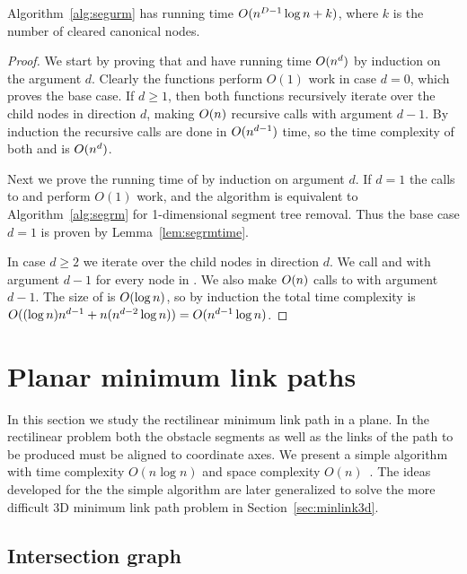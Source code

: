 \documentclass[english,gradu]{tktltiki2018}
\begin{document}
\begin{lem}\label{lem:segurmtime}Algorithm~\ref{alg:segurm} has running time $O(n^{D-1}\log n + k)$, where $k$ is the number of cleared canonical nodes.\end{lem}
\begin{proof}
We start by proving that \pdst and \recomp have running time $O(n^d)$ by induction on the argument $d$.
Clearly the functions perform $O(1)$ work in case $d=0$, which proves the base case.
If $d\ge 1$, then both functions recursively iterate over the child nodes in direction $d$, making $O(n)$ recursive calls with argument $d-1$.
By induction the recursive calls are done in $O(n^{d-1})$ time, so the time complexity of both \pdst and \recomp is $O(n^d)$.

Next we prove the running time of \cleardt by induction on argument $d$.
If $d=1$ the calls to \pdst and \recomp perform $O(1)$ work, and the algorithm is equivalent to Algorithm~\ref{alg:segrm} for 1-dimensional segment tree removal.
Thus the base case $d=1$ is proven by Lemma~\ref{lem:segrmtime}.

In case $d\ge 2$ we iterate over the child nodes in direction $d$.
We call \pdst and \recomp with argument $d-1$ for every node in .
We also make $O(n)$ calls to \cleardt with argument $d-1$.
The size of  is $O(\log n)$, so by induction the total time complexity is $O((\log n)n^{d-1} + n(n^{d-2}\log n))=O(n^{d-1}\log n)$.

\end{proof}



\section{Planar minimum link paths}\label{sec:minlink2d}

In this section we study the rectilinear minimum link path in a plane.
In the rectilinear problem both the obstacle segments as well as the links of the path to be produced must be aligned to coordinate axes.
We present a simple algorithm with time complexity $O(n\log n)$ and space complexity $O(n)$~\cite{revisited}.
The ideas developed for the the simple algorithm are later generalized to solve the more difficult 3D minimum link path problem in Section~\ref{sec:minlink3d}.

\subsection{Intersection graph}
\end{document}
